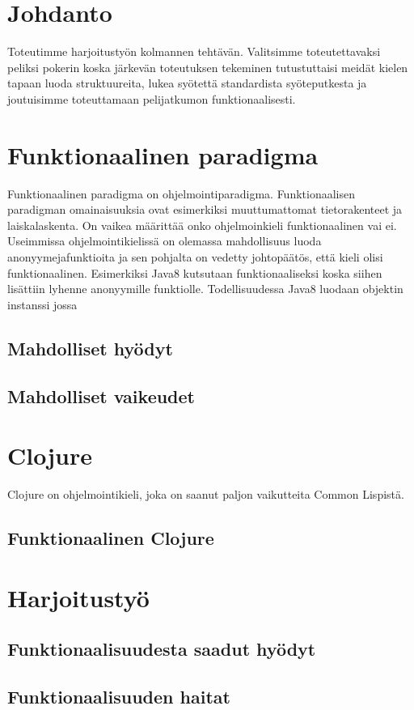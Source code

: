 \documentclass[12pt]{article}
\begin{document}
\maketitle

\section{Johdanto}
Toteutimme harjoitustyön kolmannen tehtävän.
Valitsimme toteutettavaksi peliksi pokerin koska järkevän toteutuksen tekeminen tutustuttaisi meidät kielen tapaan luoda struktuureita,
lukea syötettä standardista syöteputkesta ja joutuisimme toteuttamaan pelijatkumon funktionaalisesti. 

\section{Funktionaalinen paradigma}
Funktionaalinen paradigma on ohjelmointiparadigma. Funktionaalisen paradigman omainaisuuksia ovat esimerkiksi muuttumattomat tietorakenteet ja laiskalaskenta.
On vaikea määrittää onko ohjelmoinkieli funktionaalinen vai ei. Useimmissa ohjelmointikielissä on olemassa mahdollisuus luoda anonyymejafunktioita ja sen pohjalta on vedetty johtopäätös, että kieli olisi funktionaalinen. Esimerkiksi Java8 kutsutaan funktionaaliseksi koska siihen lisättiin lyhenne anonyymille funktiolle. Todellisuudessa Java8 luodaan objektin instanssi jossa 




\subsection{Mahdolliset hyödyt}
\subsection{Mahdolliset vaikeudet}
\section{Clojure}
Clojure on ohjelmointikieli, joka on saanut paljon vaikutteita Common Lispistä. 
\subsection{Funktionaalinen Clojure}

\section{Harjoitustyö}

\subsection{Funktionaalisuudesta saadut hyödyt}

\subsection{Funktionaalisuuden haitat}



\end{document}
